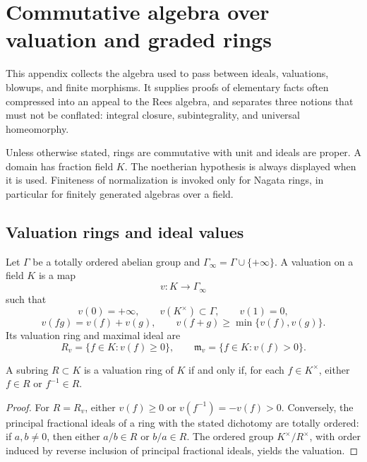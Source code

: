 \chapter{Commutative algebra over valuation and graded rings}
\label{app:valuation-algebra}

This appendix collects the algebra used to pass between ideals, valuations,
blowups, and finite morphisms.  It supplies proofs of elementary facts often
compressed into an appeal to the Rees algebra, and separates three notions
that must not be conflated: integral closure, subintegrality, and universal
homeomorphy.

Unless otherwise stated, rings are commutative with unit and ideals are
proper.  A domain has fraction field \(K\).  The noetherian hypothesis is
always displayed when it is used.  Finiteness of normalization is invoked
only for Nagata rings, in particular for finitely generated algebras over a
field.

\section{Valuation rings and ideal values}
\label{sec:appA-valuations}

\begin{definition}
\label{def:appA-krull-valuation}
Let \(\Gamma\) be a totally ordered abelian group and
\(\Gamma_\infty=\Gamma\cup\{+\infty\}\).
A valuation on a field \(K\) is a map
\[
 v:K\longrightarrow\Gamma_\infty
\]
such that
\[
 v(0)=+\infty,\qquad v(K^\times)\subset\Gamma,\qquad v(1)=0,
\]
\[
 v(fg)=v(f)+v(g),\qquad
 v(f+g)\geq\min\{v(f),v(g)\}.
\]
Its valuation ring and maximal ideal are
\[
 R_v=\{f\in K:v(f)\geq0\},\qquad
 \mathfrak m_v=\{f\in K:v(f)>0\}.
\]
\end{definition}

\begin{lemma}\label{lem:appA-valuation-dichotomy}
A subring \(R\subset K\) is a valuation ring of \(K\) if and only if, for
each \(f\in K^\times\), either \(f\in R\) or \(f^{-1}\in R\).
\end{lemma}

\begin{proof}
For \(R=R_v\), either \(v(f)\geq0\) or \(v(f^{-1})=-v(f)>0\).
Conversely, the principal fractional ideals of a ring with the stated
dichotomy are totally ordered: if \(a,b\ne0\), then either \(a/b\in R\) or
\(b/a\in R\).  The ordered group \(K^\times/R^\times\), with order induced
by reverse inclusion of principal fractional ideals, yields the valuation.
\end{proof}

